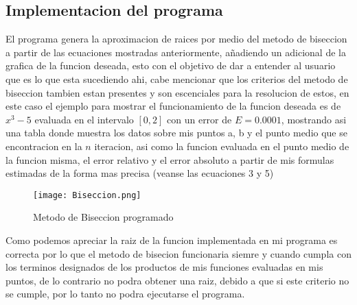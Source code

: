 \documentclass{article}
\begin{document}
\begin{multicols}{2}
\section{Implementacion del programa}
\label{sec:Imp}
El programa genera la aproximacion de raices por medio del metodo de biseccion a partir de las ecuaciones mostradas anteriormente, añadiendo un adicional de la grafica de la funcion deseada, esto con el objetivo de dar a entender al usuario que es lo que esta sucediendo ahi, cabe mencionar que los criterios del metodo de biseccion tambien estan presentes y son escenciales para la resolucion de estos, en este caso el ejemplo para mostrar el funcionamiento de la funcion deseada es de $x^3-5$ evaluada en el intervalo $[0,2]$ con un error de $E=0.0001$, mostrando asi una tabla donde muestra los datos sobre mis puntos a, b y el punto medio que se encontracion en la $n$ iteracion, asi como la funcion evaluada en el punto medio de la funcion misma, el error relativo y el error absoluto a partir de mis formulas estimadas de la forma mas precisa (veanse las ecuaciones 3 y 5)
\begin{figure}[H]
\centering
\texttt{[image: Biseccion.png]}
\caption{Metodo de Biseccion programado}
\end{figure}
Como podemos apreciar la raiz de la funcion implementada en mi programa es correcta por lo que el metodo de bisecion funcionaria siemre y cuando cumpla con los terminos designados de los productos de mis funciones evaluadas en mis puntos, de lo contrario no podra obtener una raiz, debido a que si este criterio no se cumple, por lo tanto no podra ejecutarse el programa.



\end{multicols}
\end{document}
